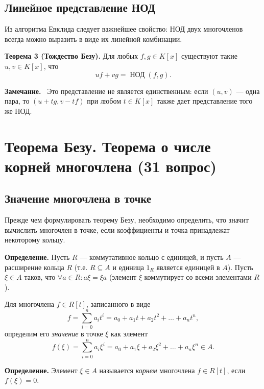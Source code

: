 \documentclass[a4paper,12pt]{article}
\newcommand{\myremark}{\textbf{Замечание.}\ }
\theoremstyle{definition}
\theoremstyle{plain}
\theoremstyle{remark}
\begin{document}
	\subsection{Линейное представление НОД}
	
	Из алгоритма Евклида следует важнейшее свойство: НОД двух многочленов всегда можно выразить в виде их линейной комбинации.
	
	\medskip
	\noindent \textbf{Теорема 3 (Тождество Безу).} Для любых \( f, g \in K[x] \) существуют такие \( u, v \in K[x] \), что
	\[
	u f + v g = \operatorname{НОД}(f, g).
	\]
	
	\myremark
	Это представление не является единственным: если \( (u, v) \) — одна пара, то \( (u + t g, v - t f) \) при любом \( t \in K[x] \) также дает представление того же НОД.
	
	
	
	\newpage
	\section{Теорема Безу. Теорема о числе корней многочлена (31 вопрос)}
	
	\subsection{Значение многочлена в точке}
	
	Прежде чем формулировать теорему Безу, необходимо определить, что значит вычислить многочлен в точке, если коэффициенты и точка принадлежат некоторому кольцу.
	
	\medskip
	
	\noindent \textbf{Определение.} Пусть \( R \) — коммутативное кольцо с единицей, и пусть \( A \) — расширение кольца \( R \) (т.е. \( R \subseteq A \) и единица \( 1_R \) является единицей в \( A \)). Пусть \( \xi \in A \) таков, что \( \forall a \in R: a\xi = \xi a \) (элемент \( \xi \) коммутирует со всеми элементами \( R \)).
	
	Для многочлена \( f \in R[t] \), записанного в виде
	\[
	f = \sum_{i=0}^{n} a_i t^i = a_0 + a_1 t + a_2 t^2 + \dots + a_n t^n,
	\]
	определим его \textit{значение} в точке \( \xi \) как элемент
	\[
	f(\xi) = \sum_{i=0}^{n} a_i \xi^i = a_0 + a_1 \xi + a_2 \xi^2 + \dots + a_n \xi^n \in A.
	\]
	
	\medskip
	\noindent \textbf{Определение.} Элемент \( \xi \in A \) называется \textit{корнем} многочлена \( f \in R[t] \), если \( f(\xi) = 0 \).
	
\end{document}
